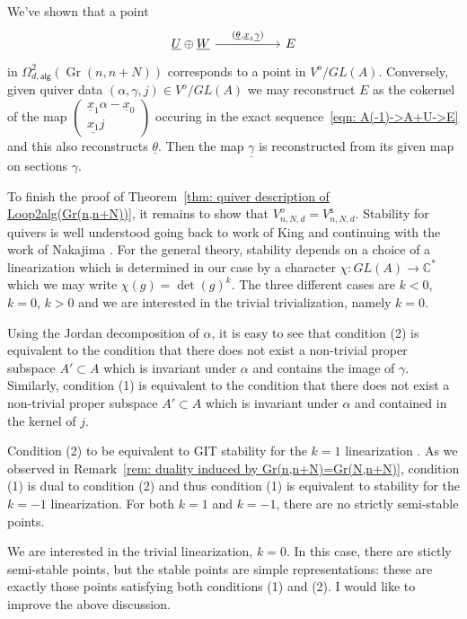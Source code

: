 \documentclass{amsart}
\theoremstyle{definition}
\newcommand{\CC} {{\mathbb C}}          %
\newcommand{\UL}[1]{\underline{#1}}
\newcommand{\alg}{\mathsf{alg}}
\newcommand{\stable}{\mathsf{s}}
\newcommand{\Gr}{\operatorname{Gr}}
\newcommand{\LoopTwo}{\Omega^{2}_{d,\alg}}
\begin{document}
We've shown that a point
\[
\begin{tikzcd}[column sep={8em,between origins}]
\UL{U}\oplus \UL{W} \arrow{r}{(\UL{\theta },\UL{x}_{1}\UL{\gamma})} &E 
\end{tikzcd}
\]
in $\LoopTwo (\Gr (n,n+N))$ corresponds to a point in
$V^{o}/GL(A)$. Conversely, given quiver data $(\alpha ,\gamma ,j)\in
V^{o}/GL(A)$ we may reconstruct $E$ as the cokernel of the map
$\begin{pmatrix}\UL{x}_{1}\alpha -\UL{x}_{0}\\
\UL{x_{1}}j   \end{pmatrix} $ occuring in the exact
sequence~\eqref{eqn: A(-1)->A+U->E} and this also reconstructs
$\UL{\theta}$. Then the map $\UL{\gamma}$ is reconstructed from its
given map on sections $\gamma$.



To finish the proof of Theorem~\ref{thm: quiver description of
Loop2alg(Gr(n,n+N))}, it remains to show that $V^{o}_{n,N,d} =
V^{\stable}_{n,N,d}$. Stability for quivers is well understood going
back to work of King \cite{King-quivers} and continuing with the work
of Nakajima \cite{Nakajima-Duke88,Nakajima-Handsaw}. For the general
theory, stability depends on a choice of a linearization which is
determined in our case by a character $\chi : GL(A)\to \CC^{*}$ which
we may write $\chi (g) = \operatorname{det}(g)^{k}$. The three
different cases are $k<0$, $k=0$, $k>0$ and we are interested in the
trivial trivialization, namely $k=0$.

Using the Jordan decomposition of $\alpha$, it is easy to see that
condition (2) is equivalent to the condition that there does not exist
a non-trivial proper subspace $A'\subset A$ which is invariant under
$\alpha$ and contains the image of $\gamma$. Similarly, condition (1)
is equivalent to the condition that there does not exist a non-trivial
proper subspace $A'\subset A$ which is invariant under $\alpha$ and
contained in the kernel of $j$.


Condition (2) to be equivalent to GIT stability for the $k=1$
linearization \cite[Def.~2.2]{Nakajima-Handsaw}. As we observed in
Remark~\ref{rem: duality induced by Gr(n,n+N)=Gr(N,n+N)}, condition
(1) is dual to condition (2) and thus condition (1) is equivalent to
stability for the $k=-1$ linearization. For both $k=1$ and $k=-1$,
there are no strictly semi-stable points.

We are interested in the trivial linearization, $k=0$. In this case,
there are stictly semi-stable points, but the stable points are simple
representations: these are exactly those points satisfying both
conditions (1) and (2). {\color{red} I would like to improve the above
discussion.}
\end{document}
